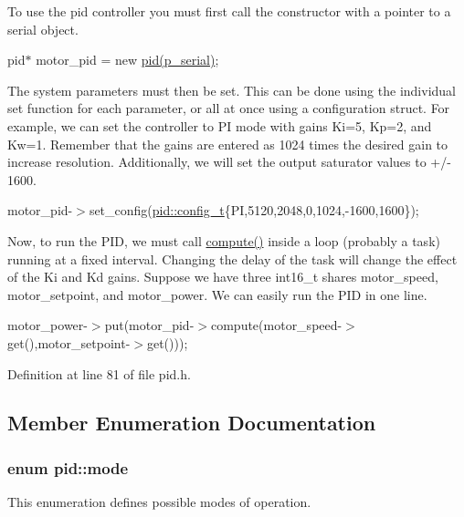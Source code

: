  To use the pid controller you must first call the constructor with a pointer to a serial object.\par
 {\ttfamily pid$\ast$} {\ttfamily motor\-\_\-pid} {\ttfamily =} {\ttfamily new} {\ttfamily \hyperlink{classpid}{pid(p\-\_\-serial)}}; \par
 The system parameters must then be set. This can be done using the individual set function for each parameter, or all at once using a configuration struct. For example, we can set the controller to P\-I mode with gains Ki=5, Kp=2, and Kw=1. Remember that the gains are entered as 1024 times the desired gain to increase resolution. Additionally, we will set the output saturator values to +/-\/ 1600. \par
 {\ttfamily motor\-\_\-pid-\/$>$set\-\_\-config}(\hyperlink{classpid_a13d711458f38f6f9e39baa39a6353a1f}{pid\-::config\-\_\-t}\{P\-I,5120,2048,0,1024,-\/1600,1600\});\par
 Now, to run the P\-I\-D, we must call \hyperlink{classpid_afa843ac964cf25eded9d2a80ef2b9ceb}{compute()} inside a loop (probably a task) running at a fixed interval. Changing the delay of the task will change the effect of the Ki and Kd gains. Suppose we have three {\ttfamily int16\-\_\-t} shares {\ttfamily motor\-\_\-speed}, {\ttfamily motor\-\_\-setpoint}, and {\ttfamily motor\-\_\-power}. We can easily run the P\-I\-D in one line.\par
 {\ttfamily motor\-\_\-power-\/$>$put}(motor\-\_\-pid-\/$>$compute(motor\-\_\-speed-\/$>$get(),motor\-\_\-setpoint-\/$>$get()));\par


Definition at line 81 of file pid.\-h.



\subsection{Member Enumeration Documentation}
\hypertarget{classpid_ae300b76b8ca84b4e1f31500d843b61c5}{
\subsubsection[{mode}]{\setlength{\rightskip}{0pt plus 5cm}enum {\bf pid\-::mode}}}\label{classpid_ae300b76b8ca84b4e1f31500d843b61c5}


This enumeration defines possible modes of operation. 

